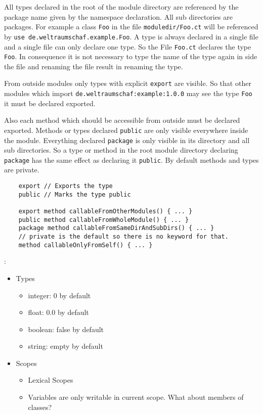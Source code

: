 \documentclass[a4paper,12pt]{article}
\begin{document}
All types declared in the root of the module directory are referenced by the package name given by the namespace declaration. All sub directories are packages. For example a class \verb|Foo| in the file \verb|moduledir/Foo.ct| will be referenced by \verb|use de.weltraumschaf.example.Foo|. A type is always declared in a single file and a single file can only declare one type. So the File \verb|Foo.ct| declares the type \verb|Foo|. In consequence it is not necessary to type the name of the type again in side the file and renaming the file result in renaming the type.

From outside modules only types with explicit \verb|export| are visible. So that other modules which import \verb|de.weltraumschaf:example:1.0.0| may see the type \verb|Foo| it must be declared exported.

Also each method which should be accessible from outside must be declared exported. Methods or types declared \verb|public| are only visible everywhere inside the module. Everything declared \verb|package| is only visible in its directory and all sub directories. So a type or method in the root module directory declaring \verb|package| has the same effect as declaring it \verb|public|. By default methods and types are private.

\begin{verbatim}
    export // Exports the type
    public // Marks the type public

    export method callableFromOtherModules() { ... }
    public method callableFromWholeModule() { ... }
    package method callableFromSameDirAndSubDirs() { ... }
    // private is the default so there is no keyword for that.
    method callableOnlyFromSelf() { ... }
\end{verbatim}

:

\begin{itemize}
    \item Types
    \begin{itemize}
        \item integer: 0 by default
        \item float: 0.0 by default
        \item boolean: false by default
        \item string: empty by default
    \end{itemize} 
    \item Scopes
    \begin{itemize}
        \item Lexical Scopes
        \item Variables are only writable in current scope. What about members of classes?
    \end{itemize}
\end{itemize}
\end{document}
